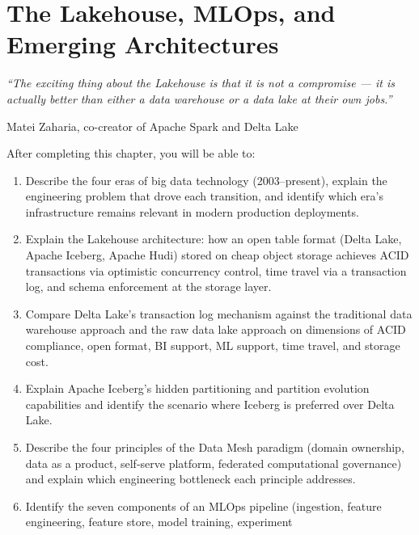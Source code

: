 
\chapter{The Lakehouse, MLOps, and Emerging Architectures}
\label{ch:modern-stack}

\epigraph{\textit{``The exciting thing about the Lakehouse is that it is
not a compromise --- it is actually better than either a data warehouse
or a data lake at their own jobs.''}}{Matei Zaharia,
co-creator of Apache Spark and Delta Lake}

\vspace{4pt}

\begin{chapterlearning}
After completing this chapter, you will be able to:
\begin{enumerate}
  \item Describe the four eras of big data technology (2003--present),
        explain the engineering problem that drove each transition,
        and identify which era's infrastructure remains relevant in
        modern production deployments.
  \item Explain the Lakehouse architecture: how an open table format
        (Delta Lake, Apache Iceberg, Apache Hudi) stored on cheap object
        storage achieves ACID transactions via optimistic concurrency
        control, time travel via a transaction log, and schema enforcement
        at the storage layer.
  \item Compare Delta Lake's transaction log mechanism against the
        traditional data warehouse approach and the raw data lake approach
        on dimensions of ACID compliance, open format, BI support, ML support,
        time travel, and storage cost.
  \item Explain Apache Iceberg's hidden partitioning and partition
        evolution capabilities and identify the scenario where Iceberg
        is preferred over Delta Lake.
  \item Describe the four principles of the Data Mesh paradigm (domain
        ownership, data as a product, self-serve platform, federated
        computational governance) and explain which engineering bottleneck
        each principle addresses.
  \item Identify the seven components of an MLOps pipeline (ingestion,
        feature engineering, feature store, model training, experiment

\end{enumerate}
\end{chapterlearning}
